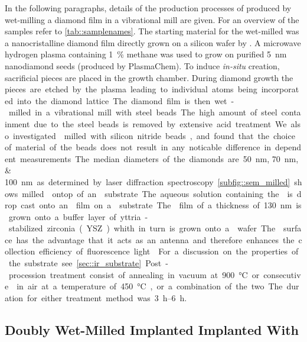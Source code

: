 		In the following paragraphs, details of the production processes of \nd produced by wet-milling a \CVD diamond film in a vibrational mill are given.
		For an overview of the samples refer to \autoref{tab::samplenames}.
		The starting material for the wet-milled \nds was a nanocristalline diamond film \cite{Williams2006a} directly grown on a silicon wafer by \CVD.
		A microwave hydrogen plasma containing \SI{1}{\percent} methane was used to grow on purified \SI{5}{\nano\meter} nanodiamond seeds (produced by PlasmaChem).
		To induce \textit{in-situ} \siv creation, sacrificial \Si pieces are placed in the growth chamber.
		During diamond growth the \si pieces are etched by the plasma leading to individual atoms being incorporated into the diamond lattice.
		The diamond film is then wet-milled in a vibrational mill with steel beads.
		The high amount of steel containment due to the steel beads is removed by extensive acid treatment.
		We also investigated \nds milled with silicon nitride beads, and found that the choice of material of the beads does not result in any noticable difference in dependent measurements.
		The median diameters of the diamonds are \SIlist{50; 70; 100}{\nano\meter} as determined by laser diffraction spectroscopy. \autoref{subfig::sem_milled} shows milled \nds ontop of an \ir substrate.
		The aqueous solution containing the \nds is drop cast onto an \ir film on a \Si substrate.
		The \ir film of a thickness of \SI{130}{nm} is grown onto a buffer layer of yttria-stabilized zirconia (YSZ) whith in turn is grown onto a \Si wafer.
		The \ir surface has the advantage that it acts as an antenna and therefore enhances the collection efficiency of fluorescence light \cite{Neu2012a}. For a discussion on the properties of the substrate see \autoref{sec::ir_substrate}.
		Post-procession treatment consist of annealing in vacuum at \SI{900}{\degreeCelsius} or consecutive \ox in air at a temperature of \SI{450}{\degreeCelsius}, or a combination of the two.
		The duration for either treatment method was \SIrange{3}{6}{\hour}.

	\subsection{Doubly Wet-Milled Implanted \Nds Implanted With \Si}\label{subsec::2_milled_nds}

